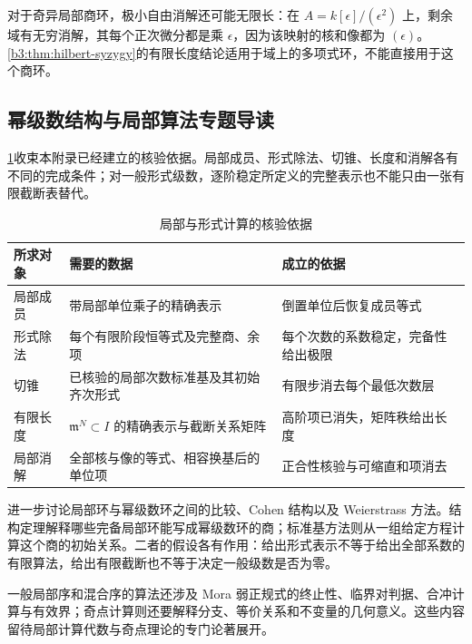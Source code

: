 \ProseParagraphBreak
对于奇异局部商环，极小自由消解还可能无限长：在 \(A=k[\epsilon]/(\epsilon^2)\) 上，剩余域有无穷消解，其每个正次微分都是乘 \(\epsilon\)，因为该映射的核和像都为 \((\epsilon)\)。\cref{b3:thm:hilbert-syzygy}的有限长度结论适用于域上的多项式环，不能直接用于这个商环。

\subsection{幂级数结构与局部算法专题导读}
\label{b3:subsec:F04:03}

\cref{b3:tab:F-computation-certificates}收束本附录已经建立的核验依据。局部成员、形式除法、切锥、长度和消解各有不同的完成条件；对一般形式级数，逐阶稳定所定义的完整表示也不能只由一张有限截断表替代。

\begin{table}[htbp]
	\centering
	\caption{局部与形式计算的核验依据}
	\label{b3:tab:F-computation-certificates}
	\begin{tabularx}{\textwidth}{@{}>{\raggedright\arraybackslash}p{}>{\raggedright\arraybackslash}p{}>{\raggedright\arraybackslash}X@{}}
		\toprule
		所求对象 & 需要的数据 & 成立的依据 \\
		\midrule
		局部成员 & 带局部单位乘子的精确表示 & 倒置单位后恢复成员等式 \\
		形式除法 & 每个有限阶段恒等式及完整商、余项 & 每个次数的系数稳定，完备性给出极限 \\
		切锥 & 已核验的局部次数标准基及其初始齐次形式 & 有限步消去每个最低次数层 \\
		有限长度 & \(\mathfrak m^N\subset I\) 的精确表示与截断关系矩阵 & 高阶项已消失，矩阵秩给出长度 \\
		局部消解 & 全部核与像的等式、相容换基后的单位项 & 正合性核验与可缩直和项消去 \\
		\bottomrule
	\end{tabularx}
\end{table}

进一步讨论局部环与幂级数环之间的比较、Cohen 结构以及 Weierstrass 方法。结构定理解释哪些完备局部环能写成幂级数环的商；标准基方法则从一组给定方程计算这个商的初始关系。二者的假设各有作用：给出形式表示不等于给出全部系数的有限算法，给出有限截断也不等于决定一般级数是否为零。

\ProseParagraphBreak
一般局部序和混合序的算法还涉及 Mora 弱正规式的终止性、临界对判据、合冲计算与有效界；奇点计算则还要解释分支、等价关系和不变量的几何意义。这些内容留待局部计算代数与奇点理论的专门论著展开。
